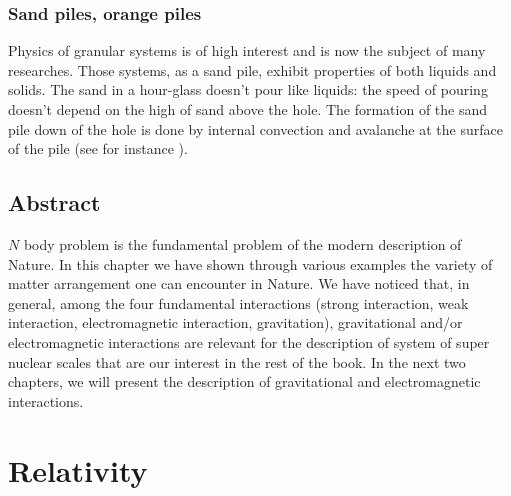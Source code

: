 \documentclass[12pt]{book}
\begin{document}
\subsection{Sand piles, orange piles}
Physics of granular systems is of high interest and is now the subject of many
researches. Those systems, as a sand pile,  exhibit properties of both liquids
and solids. The sand in a hour-glass doesn't pour like liquids: the speed of
pouring doesn't depend on the high of sand above the hole. The formation of
the sand pile down of the hole is done by internal convection and avalanche
 at the surface of the pile (see for instance
\cite{ph:granu:Guyon94}).

\section{Abstract}
$N$ body problem is the fundamental problem of the modern description of
Nature. In this chapter we have shown through various examples the
variety of 
matter arrangement one can encounter in Nature.
We have noticed that, in general, among the four fundamental
interactions (strong 
interaction, weak interaction, electromagnetic interaction,
gravitation), gravitational and/or electromagnetic interactions are
relevant for the description of system of super nuclear scales that
are our interest in the rest of the book.
In the next two chapters, we will present the description of
gravitational and electromagnetic interactions.
\chapter{Relativity}\label{chaprelat}
\end{document}
